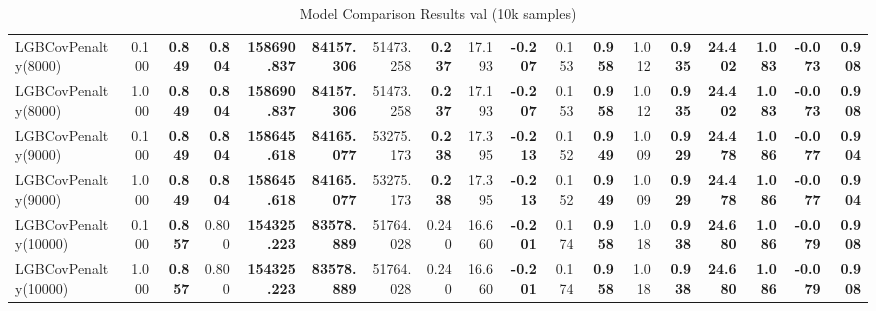 \documentclass[11pt]{article}
\theoremstyle{plain}
\theoremstyle{definition}
\newcommand{\1}{\mathbf{1}}
\begin{document}
\begin{table}[htbp]
{\begin{tabular}{lrrrrrrrrrrrrrrrrr}
LGBCovPenalty(8000) & 0.100 & \textbf{0.849} & \textbf{0.804} & \textbf{158690.837} & \textbf{84157.306} & 51473.258 & \textbf{0.237} & 17.193 & \textbf{-0.207} & 0.153 & \textbf{0.958} & 1.012 & \textbf{0.935} & \textbf{24.402} & \textbf{1.083} & \textbf{-0.073} & \textbf{0.908} \\
LGBCovPenalty(8000) & 1.000 & \textbf{0.849} & \textbf{0.804} & \textbf{158690.837} & \textbf{84157.306} & 51473.258 & \textbf{0.237} & 17.193 & \textbf{-0.207} & 0.153 & \textbf{0.958} & 1.012 & \textbf{0.935} & \textbf{24.402} & \textbf{1.083} & \textbf{-0.073} & \textbf{0.908} \\
LGBCovPenalty(9000) & 0.100 & \textbf{0.849} & \textbf{0.804} & \textbf{158645.618} & \textbf{84165.077} & 53275.173 & \textbf{0.238} & 17.395 & \textbf{-0.213} & 0.152 & \textbf{0.949} & 1.009 & \textbf{0.929} & \textbf{24.478} & \textbf{1.086} & \textbf{-0.077} & \textbf{0.904} \\
LGBCovPenalty(9000) & 1.000 & \textbf{0.849} & \textbf{0.804} & \textbf{158645.618} & \textbf{84165.077} & 53275.173 & \textbf{0.238} & 17.395 & \textbf{-0.213} & 0.152 & \textbf{0.949} & 1.009 & \textbf{0.929} & \textbf{24.478} & \textbf{1.086} & \textbf{-0.077} & \textbf{0.904} \\
LGBCovPenalty(10000) & 0.100 & \textbf{0.857} & 0.800 & \textbf{154325.223} & \textbf{83578.889} & 51764.028 & 0.240 & 16.660 & \textbf{-0.201} & 0.174 & \textbf{0.958} & 1.018 & \textbf{0.938} & \textbf{24.680} & \textbf{1.086} & \textbf{-0.079} & \textbf{0.908} \\
LGBCovPenalty(10000) & 1.000 & \textbf{0.857} & 0.800 & \textbf{154325.223} & \textbf{83578.889} & 51764.028 & 0.240 & 16.660 & \textbf{-0.201} & 0.174 & \textbf{0.958} & 1.018 & \textbf{0.938} & \textbf{24.680} & \textbf{1.086} & \textbf{-0.079} & \textbf{0.908} \\
\bottomrule
\end{tabular}
     }
    \caption{Model Comparison Results val (10k samples)}
    \label{tab:model_comparison}
\end{table}
\end{document}
